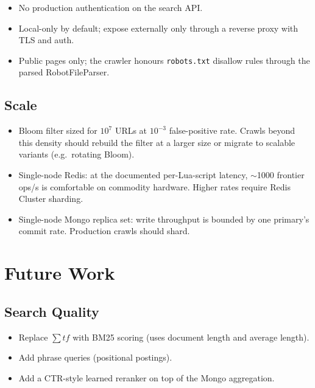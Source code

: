 \documentclass[11pt,a4paper]{article}
\newcommand{\code}[1]{\texttt{#1}}
\begin{document}
\begin{itemize}[leftmargin=1.4em]
  \item No production authentication on the search API.
  \item Local-only by default; expose externally only through a reverse proxy with TLS and auth.
  \item Public pages only; the crawler honours \code{robots.txt} disallow rules through the parsed RobotFileParser.
\end{itemize}

\subsection{Scale}

\begin{itemize}[leftmargin=1.4em]
  \item Bloom filter sized for $10^7$ URLs at $10^{-3}$ false-positive rate. Crawls beyond this density should rebuild the filter at a larger size or migrate to scalable variants (e.g.\ rotating Bloom).
  \item Single-node Redis: at the documented per-Lua-script latency, $\sim$1000 frontier ops/s is comfortable on commodity hardware. Higher rates require Redis Cluster sharding.
  \item Single-node Mongo replica set: write throughput is bounded by one primary's commit rate. Production crawls should shard.
\end{itemize}

\section{Future Work}

\subsection{Search Quality}

\begin{itemize}[leftmargin=1.4em]
  \item Replace \(\sum tf\) with BM25 scoring (uses document length and average length).
  \item Add phrase queries (positional postings).
  \item Add a CTR-style learned reranker on top of the Mongo aggregation.
\end{itemize}
\end{document}
